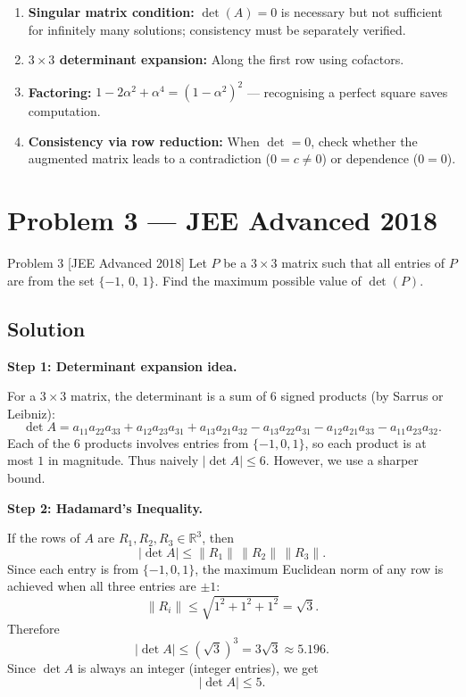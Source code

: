 \documentclass[12pt]{article}
\begin{document}
\begin{propbox}
\begin{enumerate}[leftmargin=*, label=\textbf{P\arabic*.}]
  \item \textbf{Singular matrix condition:} $\det(A) = 0$ is necessary but not sufficient for infinitely many solutions; consistency must be separately verified.
  \item \textbf{$3\times 3$ determinant expansion:} Along the first row using cofactors.
  \item \textbf{Factoring:} $1 - 2\alpha^2 + \alpha^4 = (1 - \alpha^2)^2$ — recognising a perfect square saves computation.
  \item \textbf{Consistency via row reduction:} When $\det = 0$, check whether the augmented matrix leads to a contradiction ($0 = c \neq 0$) or dependence ($0 = 0$).
\end{enumerate}
\end{propbox}

\section{Problem 3 — JEE Advanced 2018}

\begin{problembox}{Problem 3 \hfill \normalfont\small [JEE Advanced 2018]}
Let $P$ be a $3\times 3$ matrix such that all entries of $P$ are from the set $\{-1,\,0,\,1\}$. Find the maximum possible value of $\det(P)$.
\end{problembox}

\subsection*{Solution}

\textbf{Step 1: Determinant expansion idea.}

For a $3\times 3$ matrix, the determinant is a sum of 6 signed products (by Sarrus or Leibniz):
\[
\det A = a_{11}a_{22}a_{33} + a_{12}a_{23}a_{31} + a_{13}a_{21}a_{32}
       - a_{13}a_{22}a_{31} - a_{12}a_{21}a_{33} - a_{11}a_{23}a_{32}.
\]
Each of the 6 products involves entries from $\{-1,0,1\}$, so each product is at most $1$ in magnitude. Thus naively $|\det A| \leq 6$. However, we use a sharper bound.

\textbf{Step 2: Hadamard's Inequality.}

If the rows of $A$ are $R_1, R_2, R_3 \in \mathbb{R}^3$, then
\[
|\det A| \leq \|R_1\|\,\|R_2\|\,\|R_3\|.
\]
Since each entry is from $\{-1,0,1\}$, the maximum Euclidean norm of any row is achieved when all three entries are $\pm 1$:
\[
\|R_i\| \leq \sqrt{1^2 + 1^2 + 1^2} = \sqrt{3}.
\]
Therefore
\[
|\det A| \leq (\sqrt{3})^3 = 3\sqrt{3} \approx 5.196.
\]
Since $\det A$ is always an integer (integer entries), we get
\[
|\det A| \leq 5.
\]
\end{document}

